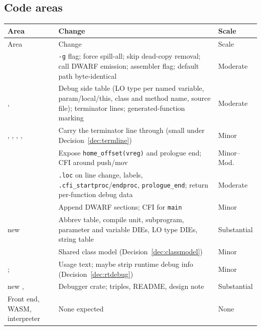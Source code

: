 \documentclass[10pt]{article}
\newcommand{\code}[1]{\texttt{\small #1}}
\begin{document}
\subsection{Code areas}\label{sec:p4-code}
\begin{xltabular}{\linewidth}{@{}L{4.2cm}Y L{1.7cm}@{}}
\toprule
Area & Change & Scale \\
\midrule
\endfirsthead
\toprule Area & Change & Scale \\ \midrule
\endhead
{} & \code{-g} flag; force spill-all; skip dead-copy removal; call DWARF emission; assembler flag; default path byte-identical & Moderate \\
,  & Debug side table (LO type per named variable, param/local/this, class and method name, source file); terminator lines; generated-function marking & Moderate \\
, , , ,  & Carry the terminator line through (small under Decision~\ref{dec:termline}) & Minor \\
 & Expose \code{home\_offset(vreg)} and prologue end; CFI around push/mov & Minor--Mod. \\
 & \code{.loc} on line change, labels, \code{.cfi\_startproc}/\code{endproc}, \code{prologue\_end}; return per-function debug data & Moderate \\
 & Append DWARF sections; CFI for \code{main} & Minor \\
new  & Abbrev table, compile unit, subprogram, parameter and variable DIEs, LO type DIEs, string table & Substantial \\
 & Shared class model (Decision~\ref{dec:classmodel}) & Minor \\
;  & Usage text; maybe strip runtime debug info (Decision~\ref{dec:rtdebug}) & Minor \\
new ,  & Debugger crate; triples, README, design note & Substantial \\
Front end, WASM, interpreter & None expected & None \\
\bottomrule
\end{xltabular}
\end{document}
